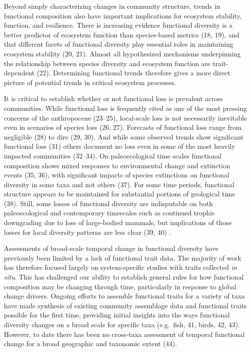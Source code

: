 \documentclass{article}
\begin{document}
Beyond simply characterizing changes in community structure, trends in
functional composition also have important implications for ecosystem
stability, function, and resilience. There is increasing evidence
functional diversity is a better predictor of ecosystem function than
species-based metrics (18, 19), and that different facets of functional
diversity play essential roles in maintaining ecosystem stability (20,
21). Almost all hypothesized mechanisms underpinning the relationship
between species diversity and ecosystem function are trait-dependent
(22). Determining functional trends therefore gives a more direct
picture of potential trends in critical ecosystem processes.

It is critical to establish whether or not functional loss is prevalent
across communities. While functional loss is frequently cited as one of
the most pressing concerns of the anthropocene (23--25), local-scale
loss is not necessarily inevitable even in scenarios of species loss
(26, 27). Forecasts of functional loss range from negligible (28) to
dire (29, 30). And while some observed trends show significant
functional loss (31) others document no loss even in some of the most
heavily impacted communities (32--34). On paleoecological time scales
functional composition shows mixed responses to environmental change and
extinction events (35, 36), with significant impacts of species
extinctions on functional diversity in some taxa and not others (37).
For some time periods, functional structure appears to be maintained for
substantial portions of geological time (38). Still, some losses of
functional diversity are indisputable on both paleoecological and
contemporary timescales such as continued trophic downgrading due to
loss of large-bodied mammals, but implications of those losses for local
diversity patterns are less clear (39, 40) .

Assessments of broad-scale temporal change in functional diversity have
previously been limited by a lack of functional trait data. The majority
of work has therefore focused largely on system-specific studies with
traits collected \emph{in situ}. This has challenged our ability to
establish general rules for how functional composition may be changing
through time, particularly in response to global change drivers. Ongoing
efforts to assemble functional traits for a variety of taxa have made
synthesis of existing community assemblage data and functional traits
possible for the first time, providing initial insights into the ways
functional diversity changes on a broad scale for specific taxa
(e.g.~fish, 41, birds, 42, 43). However, to date there has been no
cross-taxa assessment of temporal functional change for a broad
geographic and taxonomic extent (44).
\end{document}
